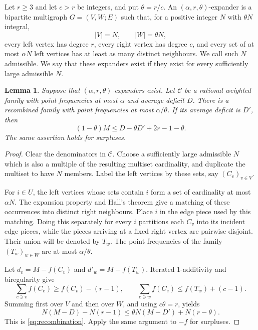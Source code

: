 \documentclass[11pt,a4paper]{amsart}
\newtheorem{lemma}[theorem]{Lemma}
\newcommand{\cC}{\mathcal C}
\begin{document}
Let \(r\geqslant3\) and let \(c>r\) be integers, and put
\(\theta=r/c\).  An \((\alpha,r,\theta)\)-expander is a bipartite
multigraph \(G=(V,W;E)\) such that, for a positive integer \(N\) with
\(\theta N\) integral,
\[
 |V|=N,\qquad |W|=\theta N,
\]
every left vertex has degree \(r\), every right vertex has degree \(c\), and
every set of at most \(\alpha N\) left vertices has at least as many distinct
neighbours.  We call such \(N\) admissible.  We say that these expanders
exist if they exist for every sufficiently large admissible \(N\).

\begin{lemma}\label{lem:recombination}
Suppose that \((\alpha,r,\theta)\)-expanders exist.  Let \(\cC\) be a
rational weighted family with point frequencies at most \(\alpha\) and
average deficit \(D\).  There is a recombined family with point frequencies
at most \(\alpha/\theta\).  If its average deficit is \(D'\), then
\begin{equation}\label{eq:recombination}
        (1-\theta)M\leqslant D-\theta D'+2r-1-\theta.
\end{equation}
The same assertion holds for surpluses.
\end{lemma}

\begin{proof}
Clear the denominators in \(\cC\).  Choose a sufficiently large admissible
\(N\) which is also a multiple of the resulting multiset cardinality, and
duplicate the multiset to have \(N\) members.  Label the left vertices by
these sets, say \((C_v)_{v\in V}\).

For \(i\in U\), the left vertices whose sets contain \(i\) form a set of
cardinality at most \(\alpha N\).  The expansion property and Hall's theorem
give a matching of these occurrences into distinct right neighbours.  Place
\(i\) in the edge piece used by this matching.  Doing this separately for
every \(i\) partitions each \(C_v\) into its incident edge pieces, while the
pieces arriving at a fixed right vertex are pairwise disjoint.  Their union
will be denoted by \(T_w\).  The point frequencies of the family
\((T_w)_{w\in W}\) are at most \(\alpha/\theta\).

Let \(d_v=M-f(C_v)\) and \(d'_w=M-f(T_w)\).  Iterated
\(1\)-additivity and biregularity give
\[
 \sum_{e\ni v}f(C_e)\geqslant f(C_v)-(r-1),
 \qquad
 \sum_{e\ni w}f(C_e)\leqslant f(T_w)+(c-1).
\]
Summing first over \(V\) and then over \(W\), and using
\(c\theta=r\), yields
\[
 N(M-D)-N(r-1)
 \leqslant \theta N(M-D')+N(r-\theta).
\]
This is \eqref{eq:recombination}.  Apply the same argument to \(-f\) for
surpluses.
\end{proof}
\end{document}
